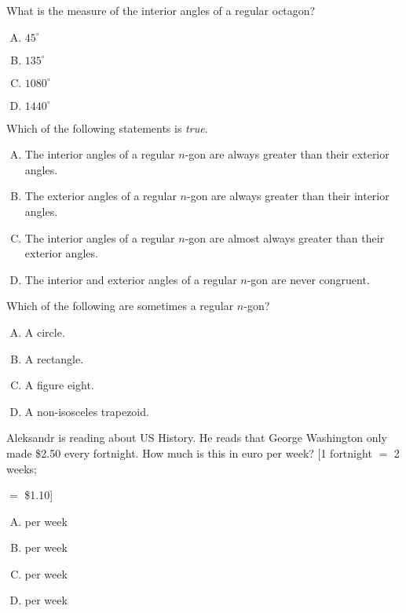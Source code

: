 \documentclass[12pt,letterpaper]{exam}
\begin{document}
\begin{questions}
\vfill



\question What is the measure of the interior angles of a regular octagon?
        \begin{enumerate}[A.]
        \item $45^\circ$
        \item $135^\circ$
        \item $1080^\circ$ 
        \item $1440^\circ$
        \end{enumerate}



\vfill



\question Which of the following statements is \textit{true}. 
        \begin{enumerate}[A.]
        \item The interior angles of a regular $n$-gon are always greater than their exterior angles. 
        \item The exterior angles of a regular $n$-gon are always greater than their interior angles.
        \item The interior angles of a regular $n$-gon are almost always greater than their exterior angles.
        \item The interior and exterior angles of a regular $n$-gon are never congruent. 
        \end{enumerate}



\vfill



\question Which of the following are sometimes a regular $n$-gon?
        \begin{enumerate}[A.]
        \item A circle.
        \item A rectangle. 
        \item A figure eight. 
        \item A non-isosceles trapezoid. 
        \end{enumerate}



\newpage



\question Aleksandr is reading about US History. He reads that George Washington only made \$2.50 every fortnight. How much is this in euro per week? [1 fortnight $=$ 2 weeks; \par {} $=$ \$1.10]
        \begin{enumerate}[A.]
        \item {} per week 
        \item {} per week
        \item {} per week
        \item {} per week 
        \end{enumerate}




\end{questions}
\end{document}
